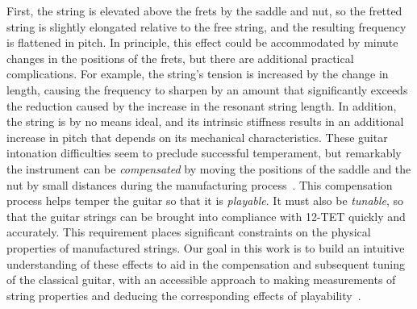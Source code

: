 First, the string is elevated above the frets by the saddle and nut, so the fretted string is slightly elongated relative to the free string, and the resulting frequency is flattened in pitch. In principle, this effect could be accommodated by minute changes in the positions of the frets, but there are additional practical complications. For example, the string's tension is increased by the change in length, causing the frequency to sharpen by an amount that significantly exceeds the reduction caused by the increase in the resonant string length. In addition, the string is by no means ideal, and its intrinsic stiffness results in an additional increase in pitch that depends on its mechanical characteristics. These guitar intonation difficulties seem to preclude successful temperament, but remarkably the instrument can be \emph{compensated} by moving the positions of the saddle and the nut by small distances during the manufacturing process~\cite{ref:byers1996cgi,ref:varieschi2010icf}. This compensation process helps temper the guitar so that it is \emph{playable}. It must also be \emph{tunable}, so that the guitar strings can be brought into compliance with 12-TET quickly and accurately. This requirement places significant constraints on the physical properties of manufactured strings. Our goal in this work is to build an intuitive understanding of these effects to aid in the compensation and subsequent tuning of the classical guitar, with an accessible approach to making measurements of string properties and deducing the corresponding effects of playability~\cite{ref:erkut2000epe,ref:noll2014gim,ref:dostal2020srw}.


